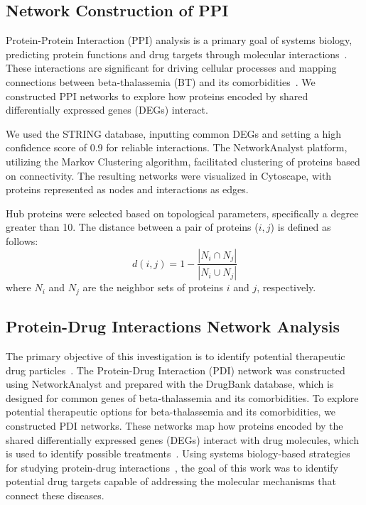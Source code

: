 \vspace*{-\parskip}
\subsection{Network Construction of PPI}
\label{sec:ppi_network}

Protein-Protein Interaction (PPI) analysis is a primary goal of systems biology, predicting protein functions and drug targets through molecular interactions~\cite{ppi_ref1}. These interactions are significant for driving cellular processes and mapping connections between beta-thalassemia (BT) and its comorbidities~\cite{ppi_ref2}. We constructed PPI networks to explore how proteins encoded by shared differentially expressed genes (DEGs) interact.

We used the STRING database, inputting common DEGs and setting a high confidence score of 0.9 for reliable interactions. The NetworkAnalyst platform, utilizing the Markov Clustering algorithm, facilitated clustering of proteins based on connectivity. The resulting networks were visualized in Cytoscape, with proteins represented as nodes and interactions as edges.

Hub proteins were selected based on topological parameters, specifically a degree greater than 10. The distance between a pair of proteins (\( i, j \)) is defined as follows:
\begin{equation}
d(i,j) = 1 - \frac{|N_i \cap N_j|}{|N_i \cup N_j|}
\label{eq:protein_distance}
\end{equation}
where \( N_i \) and \( N_j \) are the neighbor sets of proteins \( i \) and \( j \), respectively.

\vspace*{-\parskip}
\subsection{Protein-Drug Interactions Network Analysis}
\label{sec:pdi_network}

The primary objective of this investigation is to identify potential therapeutic drug particles~\cite{pdi_ref1}. The Protein-Drug Interaction (PDI) network was constructed using NetworkAnalyst and prepared with the DrugBank database, which is designed for common genes of beta-thalassemia and its comorbidities. To explore potential therapeutic options for beta-thalassemia and its comorbidities, we constructed PDI networks. These networks map how proteins encoded by the shared differentially expressed genes (DEGs) interact with drug molecules, which is used to identify possible treatments~\cite{pdi_ref2}. Using systems biology-based strategies for studying protein-drug interactions~\cite{pdi_ref3}, the goal of this work was to identify potential drug targets capable of addressing the molecular mechanisms that connect these diseases.

